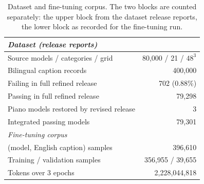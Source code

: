 \begin{table}[t]
\centering
\small
\setlength{\tabcolsep}{4pt}
\begin{tabular}{lr}
\toprule
\multicolumn{2}{l}{\emph{Dataset (release reports)}} \\
\midrule
Source models / categories / grid & 80,000 / 21 / $48^3$ \\
Bilingual caption records & 400,000 \\
Failing in full refined release & 702 (0.88\%) \\
Passing in full refined release & 79,298 \\
Piano models restored by revised release & 3 \\
Integrated passing models & 79,301 \\
\midrule
\multicolumn{2}{l}{\emph{Fine-tuning corpus}} \\
\midrule
(model, English caption) samples & 396,610 \\ %
Training / validation samples & 356,955 / 39,655 \\
Tokens over 3 epochs & 2,228,044,818 \\ %
\bottomrule
\end{tabular}
\caption{Dataset and fine-tuning corpus. The two blocks are counted separately: the upper block from the dataset release reports, the lower block as recorded for the fine-tuning run.}
\label{tab:training-data}
\end{table}
